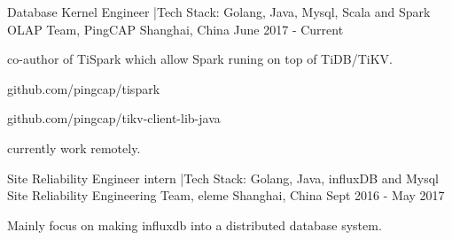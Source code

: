 

\begin{cventries}
  \cventry
    {Database Kernel Engineer \enskip|\enskip Tech Stack: Golang, Java, Mysql, Scala and Spark} %
    {OLAP Team, PingCAP} %
    {Shanghai, China} %
    {June 2017 - Current} %
    {
      \begin{cvitems} %
        \item {co-author of TiSpark which allow Spark runing on top of TiDB/TiKV.}
        \item {github.com/pingcap/tispark}
        \item {github.com/pingcap/tikv-client-lib-java}
        \item {currently work remotely.}
      \end{cvitems}
    }


  \cventry
    {Site Reliability Engineer intern \enskip|\enskip Tech Stack: Golang, Java, influxDB and Mysql} %
    {Site Reliability Engineering Team, eleme} %
    {Shanghai, China} %
    {Sept 2016 - May 2017} %
    {
      \begin{cvitems} %
        \item {Mainly focus on making influxdb into a distributed database system.}
      \end{cvitems}
    }

\end{cventries}
